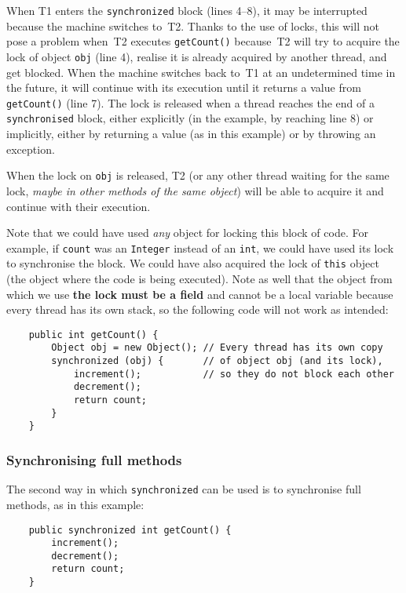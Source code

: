 When T1 enters the \verb+synchronized+ block (lines 4--8), 
it may be interrupted
because the machine switches to~T2. Thanks to the use of locks, 
this will not pose a problem when~T2 executes
\verb+getCount()+ because~T2 will try to acquire the lock of object
\verb+obj+ (line 4), realise it is already acquired by another
thread, and get blocked. When the machine switches back to~T1 at an
undetermined time in the future, it will
continue with its execution until it returns a value
from \verb+getCount()+ (line 7). The lock is released when a thread
reaches the end of a \verb+synchronised+ block, either explicitly (in
the example, by reaching line 8) or implicitly, either by returning a
value (as in this example) or by throwing an exception. 

When the lock on \verb+obj+ is released, T2 (or any other thread
waiting for the same lock, \emph{maybe in other methods of the same object})
will be able to acquire it and continue with their execution. 

Note that we could have used \emph{any} object for locking this block of
code. For example, if \verb+count+ was an \verb+Integer+ instead of an
\verb+int+, we could have used its lock to synchronise the block. We
could have also acquired the lock of \verb+this+ object (the object
where the code is being executed). Note as well
that the object from which we use {\bf the lock must be a field} and 
cannot be a local
variable because every thread has its own stack, so the following code
will not work as intended: 

\begin{verbatim}
    public int getCount() {
        Object obj = new Object(); // Every thread has its own copy 
        synchronized (obj) {       // of object obj (and its lock),
            increment();           // so they do not block each other
            decrement();
            return count;
        }
    }
\end{verbatim}

\subsubsection{Synchronising full methods}
\label{sec:synchr-full}

The second way in which \verb+synchronized+ can be used is to
synchronise full methods, as in this example: 

\begin{verbatim}
    public synchronized int getCount() {
        increment();
        decrement();
        return count;
    }
\end{verbatim}

